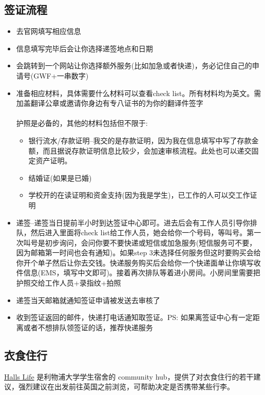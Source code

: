 \subsection{签证流程}
\begin{itemize}
    \item 去官网填写相应信息
    \item 信息填写完毕后会让你选择递签地点和日期
    \item 会跳转到一个网站让你选择额外服务(比如加急或者快递)，务必记住自己的申请号(GWF+一串数字)
    \item 准备相应材料，具体需要什么材料可以查看check list。所有材料均为英文。需加盖翻译公章或邀请你身边有专八证书的为你的翻译件签字 \\ \\
    护照是必备的，其他的材料包括但不限于:
    \begin{itemize}
        \item 银行流水/存款证明--我交的是存款证明，因为我在信息填写中写了存款金额，而且据说存款证明信息比较少，会加速审核流程。此处也可以递交固定资产证明。
        \item 结婚证(如果是已婚)
        \item 学校开的在读证明和资金支持(因为我是学生)，已工作的人可以交工作证明
    \end{itemize}
    \item 递签--递签当日提前半小时到达签证中心即可。进去后会有工作人员引导你排队，然后进入里面将check list给工作人员，她会给你一个号码，等叫号。第一次叫号是初步询问，会问你要不要快递或短信或加急服务(短信服务可不要，因为邮箱第一时间也会有通知)。如果step 3未选择任何服务但这时要购买会给你开个单子然后让你去交钱。快递服务购买后会给你一个快递面单让你填写收件信息(EMS，填写中文即可)。接着再次排队等着进小房间。小房间里需要把护照交给工作人员+录指纹+拍照
    \item 递签当天邮箱就通知签证申请被发送去审核了
    \item 收到签证返回的邮件，快递打电话通知取签证。PS: 如果离签证中心有一定距离或者不想排队领签证的话，推荐快递服务
\end{itemize}


\subsection{衣食住行}
\href{https://hallslife.liverpool.ac.uk}{Halls Life} 是利物浦大学学生宿舍的 community hub，提供了对衣食住行的若干建议，强烈建议在出发前往英国之前浏览，可帮助决定是否携带某些行李。

